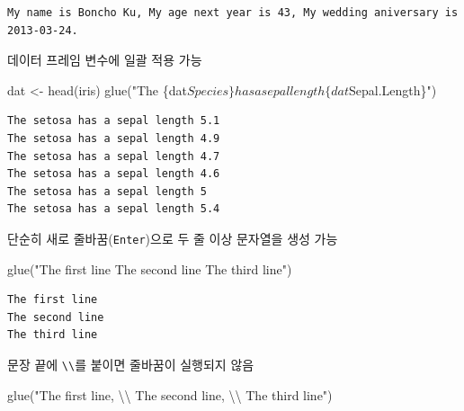 \documentclass[
  11pt,
]{krantz}
\newenvironment{Shaded}{\begin{snugshade}}{\end{snugshade}}
\newcommand{\FunctionTok}[1]{\textcolor[rgb]{0,0,0}{#1}}
\newcommand{\NormalTok}[1]{#1}
\newcommand{\OtherTok}[1]{\textcolor[rgb]{0.37,0.37,0.37}{#1}}
\newcommand{\SpecialCharTok}[1]{\textcolor[rgb]{0,0,0}{#1}}
\newcommand{\StringTok}[1]{\textcolor[rgb]{0.5,0.5,0.5}{#1}}
\begin{document}
\begin{verbatim}
My name is Boncho Ku, My age next year is 43, My wedding aniversary is 2013-03-24.
\end{verbatim}

\normalsize

데이터 프레임 변수에 일괄 적용 가능

\footnotesize

\begin{Shaded}
\begin{Highlighting}[]
\NormalTok{dat }\OtherTok{\textless{}{-}} \FunctionTok{head}\NormalTok{(iris)}
\FunctionTok{glue}\NormalTok{(}\StringTok{"The \{dat$Species\} has a sepal length \{dat$Sepal.Length\}"}\NormalTok{)}
\end{Highlighting}
\end{Shaded}

\begin{verbatim}
The setosa has a sepal length 5.1
The setosa has a sepal length 4.9
The setosa has a sepal length 4.7
The setosa has a sepal length 4.6
The setosa has a sepal length 5
The setosa has a sepal length 5.4
\end{verbatim}

\normalsize

단순히 새로 줄바꿈(\texttt{Enter})으로 두 줄 이상 문자열을 생성 가능

\footnotesize

\begin{Shaded}
\begin{Highlighting}[]
\FunctionTok{glue}\NormalTok{(}\StringTok{"The first line}
\StringTok{     The second line}
\StringTok{     The third line"}\NormalTok{)}
\end{Highlighting}
\end{Shaded}

\begin{verbatim}
The first line
The second line
The third line
\end{verbatim}

\normalsize

문장 끝에 \texttt{\textbackslash{}\textbackslash{}}를 붙이면 줄바꿈이 실행되지 않음

\footnotesize

\begin{Shaded}
\begin{Highlighting}[]
\FunctionTok{glue}\NormalTok{(}\StringTok{"The first line, }\SpecialCharTok{\textbackslash{}\textbackslash{}}
\StringTok{     The second line, }\SpecialCharTok{\textbackslash{}\textbackslash{}}
\StringTok{     The third line"}\NormalTok{)}
\end{Highlighting}
\end{Shaded}
\end{document}
